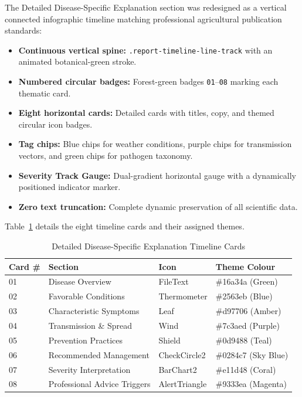 The Detailed Disease-Specific Explanation section was redesigned as a vertical connected infographic timeline matching professional agricultural publication standards:
\begin{itemize}
    \item \textbf{Continuous vertical spine:} \texttt{.report-timeline-line-track} with an animated botanical-green stroke.
    \item \textbf{Numbered circular badges:} Forest-green badges \texttt{01}--\texttt{08} marking each thematic card.
    \item \textbf{Eight horizontal cards:} Detailed cards with titles, copy, and themed circular icon badges.
    \item \textbf{Tag chips:} Blue chips for weather conditions, purple chips for transmission vectors, and green chips for pathogen taxonomy.
    \item \textbf{Severity Track Gauge:} Dual-gradient horizontal gauge with a dynamically positioned indicator marker.
    \item \textbf{Zero text truncation:} Complete dynamic preservation of all scientific data.
\end{itemize}

Table~\ref{tab:timeline_cards} details the eight timeline cards and their assigned themes.

\begin{table}[H]
\centering
\caption{Detailed Disease-Specific Explanation Timeline Cards}
\label{tab:timeline_cards}
\begin{tabular}{|p{1.4cm}|p{4.2cm}|p{2.6cm}|p{3.6cm}|}
\hline
\textbf{Card \#} & \textbf{Section} & \textbf{Icon} & \textbf{Theme Colour} \\
\hline
01 & Disease Overview & FileText & \#16a34a (Green) \\
02 & Favorable Conditions & Thermometer & \#2563eb (Blue) \\
03 & Characteristic Symptoms & Leaf & \#d97706 (Amber) \\
04 & Transmission \& Spread & Wind & \#7c3aed (Purple) \\
05 & Prevention Practices & Shield & \#0d9488 (Teal) \\
06 & Recommended Management & CheckCircle2 & \#0284c7 (Sky Blue) \\
07 & Severity Interpretation & BarChart2 & \#e11d48 (Coral) \\
08 & Professional Advice Triggers & AlertTriangle & \#9333ea (Magenta) \\
\hline
\end{tabular}
\end{table}

